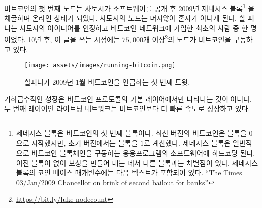\begin{comment}
Bitcoin's first node went online in 2009 after Satoshi mined the \textit{genesis
block}\footnote{The genesis block is the first block of the Bitcoin block chain.
Modern versions of Bitcoin number it as block $0$, though very early versions
counted it as block $1$. The genesis block is usually hardcoded into the
software of the applications that utilize the Bitcoin block chain. It is a
special case in that it does not reference a previous block and produces an
unspendable subsidy. The \textit{coinbase} parameter contains, along with the
normal data, the following text: \textit{\enquote{The Times 03/Jan/2009 Chancellor on
brink of second bailout for banks}} \cite{btcwiki:genesis-block}} and released
the software into the wild. His node wasn't alone for long. Hal Finney was one
of the first people to pick up on the idea and join the network. Ten years
later, as of this writing, more than
$75.000$\footnote{\url{https://bit.ly/luke-nodecount}} nodes are running
bitcoin.
\end{comment}
비트코인의 첫 번째 노드는 사토시가 소프트웨어를 공개 후 2009년 제네시스 블록\footnote{
	제네시스 블록은 비트코인의 첫 번째 블록이다. 최신 버전의 비트코인은
	블록을 $0$으로 시작했지만, 초기 버전에서는 블록을 $1$로 계산했다.
	제네시스 블록은 일반적으로 비트코인 블록체인을 구동하는 응용프로그램의 소프트웨어에
	하드코딩 된다. 이전 블록이 없이 보상을 만들어 내는 데서 다른 블록과는 차별점이 있다.
	제네시스 블록의 코인 베이스 매개변수에는 다음 텍스트가 포함되어 있다.
	\enquote{The Times 03/Jan/2009 Chancellor on brink of second bailout for banks}\cite{btcwiki:genesis-block}}
을 채굴하며 온라인 상태가 되었다.
사토시의 노드는 머지않아 혼자가 아니게 된다.
할 피니는 사토시의 아이디어를 인정하고 비트코인 네트워크에 가입한 최초의 사람 중 한 명이었다.
10년 후, 이 글을 쓰는 시점에는 $75,000$개 이상\footnote{\url{https://bit.ly/luke-nodecount}}의 노드가 비트코인을 구동하고 있다.

\begin{figure}
  \centering
  \texttt{[image: assets/images/running-bitcoin.png]}
  \caption{할피니가 2009년 1월 비트코인을 언급하는 첫 번째 트윗.}
  \label{fig:running-bitcoin}
\end{figure}

\begin{comment}
The protocol's base layer isn't the only thing growing exponentially.
The lightning network, a second layer technology, is growing at an even
faster rate.
\end{comment}
기하급수적인 성장은 비트코인 프로토콜의 기본 레이어에서만 나타나는 것이 아니다.
두 번째 레이어인 라이트닝 네트워크는 비트코인보다 더 빠른 속도로 성장하고 있다.

